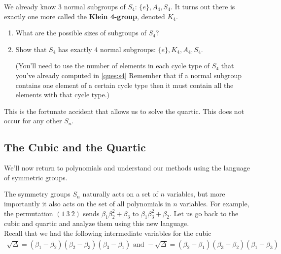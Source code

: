 We already know 3 normal subgroups of $ S_4$: $ \{ e \}, A_4, S_4$. It turns out there is exactly one more called the \textbf{Klein 4-group}, denoted $ K_4$.
\begin{questions}[resume]
  \item \begin{enumerate}
    \item What are the possible sizes of subgroups of $ S_4$?
    \item Show that $ S_4$ has exactly 4 normal subgroups: $ \{ e \}, K_4, A_4, S_4$.
    
     (You'll need to use the number of elements in each cycle type of $ S_4$ that you've already computed in \ref{ques:s4} Remember that if a normal subgroup contains one element of a certain cycle type then it must contain all the elements with that cycle type.)
  \end{enumerate}
\end{questions}
This is the fortunate accident that allows us to solve the quartic. This does not occur for any other $ S_n$.






\newpage
\subsection{The Cubic and the Quartic}


We'll now return to polynomials and understand our methods using the language of symmetric groups.


The symmetry groups $ S_n$ naturally acts on a set of $ n$ variables, but more importantly it also acts on the set of all polynomials in $ n$ variables. For example, the permutation $ (1 \: 3 \: 2)$ sends $ \beta_1 \beta_2^2 +  \beta_3 $ to $ \beta_1 \beta_3^2 +  \beta_2 $. Let us go back to the cubic and quartic and analyze them using this new language.\\


Recall that we had the following intermediate variables for the cubic
  \begin{align*}
    \sqrt{\Delta} = (\beta_1 -\beta_2)(\beta_2 - \beta_3)(\beta_3 - \beta_1) \mbox{ and } -\sqrt{\Delta} = (\beta_2 -\beta_1)(\beta_3 - \beta_2)(\beta_1 - \beta_3)
  \end{align*}

